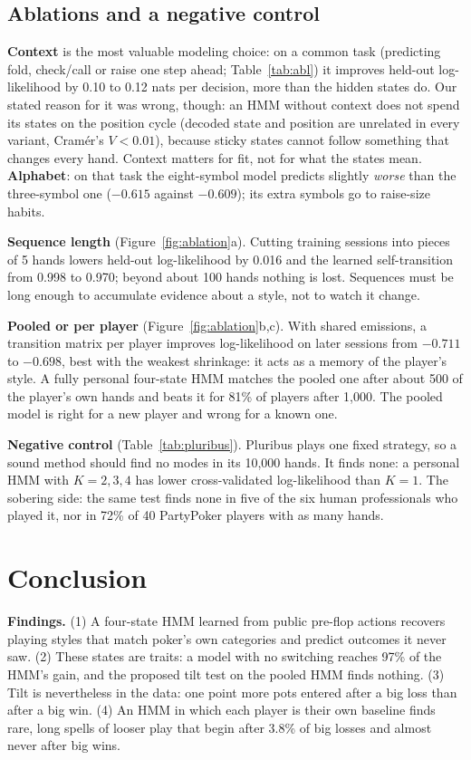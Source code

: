 \documentclass{article}
\begin{document}
\subsection{Ablations and a negative control}
\label{sec:ablations}
\textbf{Context} is the most valuable modeling choice: on a common task (predicting fold, check/call or raise one step ahead; Table~\ref{tab:abl}) it improves held-out log-likelihood by 0.10 to 0.12 nats per decision, more than the hidden states do. Our stated reason for it was wrong, though: an HMM without context does not spend its states on the position cycle (decoded state and position are unrelated in every variant, Cram\'er's $V<0.01$), because sticky states cannot follow something that changes every hand. Context matters for fit, not for what the states mean. \textbf{Alphabet}: on that task the eight-symbol model predicts slightly \emph{worse} than the three-symbol one ($-0.615$ against $-0.609$); its extra symbols go to raise-size habits.

\textbf{Sequence length} (Figure~\ref{fig:ablation}a). Cutting training sessions into pieces of 5 hands lowers held-out log-likelihood by 0.016 and the learned self-transition from 0.998 to 0.970; beyond about 100 hands nothing is lost. Sequences must be long enough to accumulate evidence about a style, not to watch it change.

\textbf{Pooled or per player} (Figure~\ref{fig:ablation}b,c). With shared emissions, a transition matrix per player improves log-likelihood on later sessions from $-0.711$ to $-0.698$, best with the weakest shrinkage: it acts as a memory of the player's style. A fully personal four-state HMM matches the pooled one after about 500 of the player's own hands and beats it for 81\% of players after 1{,}000. The pooled model is right for a new player and wrong for a known one.

\textbf{Negative control} (Table~\ref{tab:pluribus}). Pluribus plays one fixed strategy, so a sound method should find no modes in its 10{,}000 hands. It finds none: a personal HMM with $K=2,3,4$ has lower cross-validated log-likelihood than $K=1$. The sobering side: the same test finds none in five of the six human professionals who played it, nor in 72\% of 40 PartyPoker players with as many hands.

\section{Conclusion}
\textbf{Findings.} (1) A four-state HMM learned from public pre-flop actions recovers playing styles that match poker's own categories and predict outcomes it never saw. (2) These states are traits: a model with no switching reaches 97\% of the HMM's gain, and the proposed tilt test on the pooled HMM finds nothing. (3) Tilt is nevertheless in the data: one point more pots entered after a big loss than after a big win. (4) An HMM in which each player is their own baseline finds rare, long spells of looser play that begin after 3.8\% of big losses and almost never after big wins.
\end{document}

